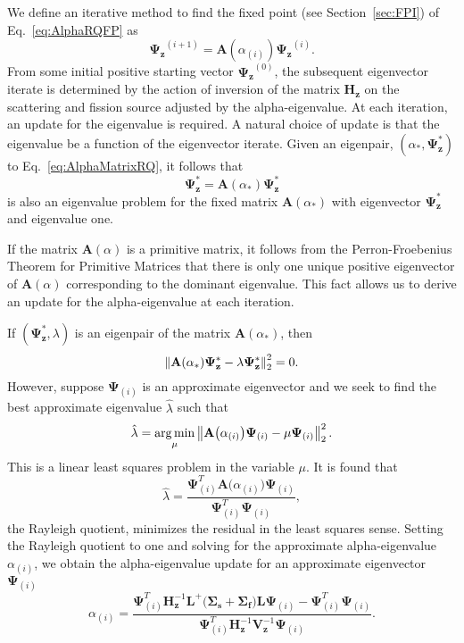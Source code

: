We define an iterative method to find the fixed point (see Section~\ref{sec:FPI}) of Eq.~\ref{eq:AlphaRQFP} as
\begin{equation}
	\mathbf{\Psi_{z}}^{(i+1)} = \mathbf{A}(\alpha_{(i)}) \mathbf{\Psi_{z}}^{(i)}.
\end{equation}
From some initial positive starting vector $\mathbf{\Psi_{z}}^{(0)}$, the subsequent eigenvector iterate is determined by the action of inversion of the matrix $\mathbf{H_{z}}$ on the scattering and fission source adjusted by the alpha-eigenvalue. At each iteration, an update for the eigenvalue is required. A natural choice of update is that the eigenvalue be a function of the eigenvector iterate. Given an eigenpair, $(\alpha_{*}, \mathbf{\Psi_{z}^{*}})$ to Eq.~\ref{eq:AlphaMatrixRQ}, it follows that
\begin{equation}
	\mathbf{\Psi_{z}^{*}} =  \mathbf{A}(\alpha_{*}) \mathbf{\Psi_{z}^{*}}
\end{equation}
is also an eigenvalue problem for the fixed matrix $\mathbf{A}(\alpha_{*})$ with eigenvector $\mathbf{\Psi}_{\mathbf{z}}^{*}$ and eigenvalue one.

If the matrix $\mathbf{A}(\alpha)$ is a primitive matrix, it follows from the Perron-Froebenius Theorem for Primitive Matrices that there is only one unique positive eigenvector of $\mathbf{A}(\alpha)$ corresponding to the dominant eigenvalue. This fact allows us to derive an update for the alpha-eigenvalue at each iteration.

If $(\mathbf{\Psi_{z}^{*}}, \lambda)$ is an eigenpair of the matrix $\mathbf{A}(\alpha_{*})$, then
\begin{equation}
\left\lVert\mathbf{A}(\alpha_{*}) \mathbf{\Psi_{z}^{*}} - \lambda \mathbf{\Psi_{z}^{*}}\right\rVert_{2}^{2} = 0.
\end{equation}
However, suppose $\mathbf{\Psi}_{(i)}$ is an approximate eigenvector and we seek to find the best approximate eigenvalue $\hat{\lambda}$ such that
\begin{equation}
\hat{\lambda} = \operatorname*{arg\,min}_{\mu} \left\lVert\mathbf{A}\big (\alpha_{(i)} \big ) \mathbf{\Psi}_{(i)} - \mu \mathbf{\Psi}_{(i)}\right\rVert_{2}^{2}. 
\end{equation}
This is a linear least squares problem in the variable $\mu$. It is found that \cite{horn_matrix_2012}
\begin{equation}
	\hat{\lambda} = \frac{\mathbf{\Psi}^{T}_{(i)} \mathbf{A}\big (\alpha_{(i)} \big ) \mathbf{\Psi}_{(i)}}{\mathbf{\Psi}^{T}_{(i)} \mathbf{\Psi}_{(i)}},
\end{equation}
the Rayleigh quotient, minimizes the residual in the least squares sense. Setting the Rayleigh quotient to one and solving for the approximate alpha-eigenvalue $\alpha_{(i)}$, we obtain the alpha-eigenvalue update for an approximate eigenvector $\mathbf{\Psi}_{(i)}$
\begin{equation}
	\alpha_{(i)} = \frac{ \mathbf{\Psi}^{T}_{(i)} \mathbf{H}^{-1}_{\mathbf{z}} \mathbf{L}^{+} \big ( \mathbf{\Sigma_{s}} + \mathbf{\Sigma_{f}} \big ) \mathbf{L} \mathbf{\Psi}_{(i)} -  \mathbf{\Psi}^{T}_{(i)}  \mathbf{\Psi}_{(i)}}{  \mathbf{\Psi}^{T}_{(i)} \mathbf{H}^{-1}_{\mathbf{z}} \mathbf{V}^{-1}_{\mathbf{z}}  \mathbf{\Psi}_{(i)}}.
	\label{eq:AlphaUpdateTwoSweep}
\end{equation}

